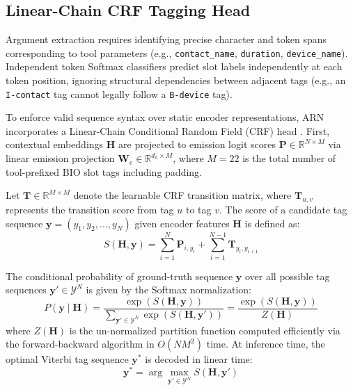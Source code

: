 \documentclass[letterpaper]{article} %
\begin{document}
\subsection{Linear-Chain CRF Tagging Head}
Argument extraction requires identifying precise character and token spans corresponding to tool parameters (e.g., \texttt{contact\_name}, \texttt{duration}, \texttt{device\_name}). Independent token Softmax classifiers predict slot labels independently at each token position, ignoring structural dependencies between adjacent tags (e.g., an \texttt{I-contact} tag cannot legally follow a \texttt{B-device} tag).

To enforce valid sequence syntax over static encoder representations, ARN incorporates a Linear-Chain Conditional Random Field (CRF) head \citep{lafferty2001conditional}. First, contextual embeddings $\mathbf{H}$ are projected to emission logit scores $\mathbf{P} \in \mathbb{R}^{N \times M}$ via linear emission projection $\mathbf{W}_e \in \mathbb{R}^{d_h \times M}$, where $M=22$ is the total number of tool-prefixed BIO slot tags including padding.

Let $\mathbf{T} \in \mathbb{R}^{M \times M}$ denote the learnable CRF transition matrix, where $\mathbf{T}_{u,v}$ represents the transition score from tag $u$ to tag $v$. The score of a candidate tag sequence $\mathbf{y} = (y_1, y_2, \dots, y_N)$ given encoder features $\mathbf{H}$ is defined as:
\begin{equation}
    S(\mathbf{H}, \mathbf{y}) = \sum_{i=1}^N \mathbf{P}_{i, y_i} + \sum_{i=1}^{N-1} \mathbf{T}_{y_i, y_{i+1}}
\end{equation}

The conditional probability of ground-truth sequence $\mathbf{y}$ over all possible tag sequences $\mathbf{y}' \in \mathcal{Y}^N$ is given by the Softmax normalization:
\begin{equation}
    P(\mathbf{y} \mid \mathbf{H}) = \frac{\exp(S(\mathbf{H}, \mathbf{y}))}{\sum_{\mathbf{y}' \in \mathcal{Y}^N} \exp(S(\mathbf{H}, \mathbf{y}'))} = \frac{\exp(S(\mathbf{H}, \mathbf{y}))}{Z(\mathbf{H})}
\end{equation}
where $Z(\mathbf{H})$ is the un-normalized partition function computed efficiently via the forward-backward algorithm in $O(N M^2)$ time. At inference time, the optimal Viterbi tag sequence $\mathbf{y}^*$ is decoded in linear time:
\begin{equation}
    \mathbf{y}^* = \arg\max_{\mathbf{y}' \in \mathcal{Y}^N} S(\mathbf{H}, \mathbf{y}')
\end{equation}
\end{document}
